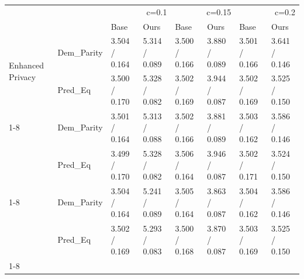 \begin{tabular}{llllllll}
\toprule
 &  & \multicolumn{2}{r}{c=0.1} & \multicolumn{2}{r}{c=0.15} & \multicolumn{2}{r}{c=0.2} \\
 &  & Base & Ours & Base & Ours & Base & Ours \\
\midrule
\multirow[t]{2}{*}{Enhanced Privacy} & Dem_Parity & 3.504 / 0.164 & 5.314 / 0.089 & 3.500 / 0.166 & 3.880 / 0.089 & 3.501 / 0.166 & 3.641 / 0.146 \\
 & Pred_Eq & 3.500 / 0.170 & 5.328 / 0.082 & 3.502 / 0.169 & 3.944 / 0.087 & 3.502 / 0.169 & 3.525 / 0.150 \\
\cline{1-8}
\multirow[t]{2}{*}{Hybrid (50-50)} & Dem_Parity & 3.501 / 0.164 & 5.313 / 0.088 & 3.502 / 0.166 & 3.881 / 0.089 & 3.503 / 0.162 & 3.586 / 0.146 \\
 & Pred_Eq & 3.499 / 0.170 & 5.328 / 0.082 & 3.506 / 0.164 & 3.946 / 0.087 & 3.502 / 0.171 & 3.524 / 0.150 \\
\cline{1-8}
\multirow[t]{2}{*}{Communication Efficient} & Dem_Parity & 3.504 / 0.164 & 5.241 / 0.089 & 3.505 / 0.164 & 3.863 / 0.087 & 3.504 / 0.162 & 3.586 / 0.146 \\
 & Pred_Eq & 3.502 / 0.169 & 5.293 / 0.083 & 3.500 / 0.168 & 3.870 / 0.087 & 3.503 / 0.169 & 3.525 / 0.150 \\
\cline{1-8}
\bottomrule
\end{tabular}
